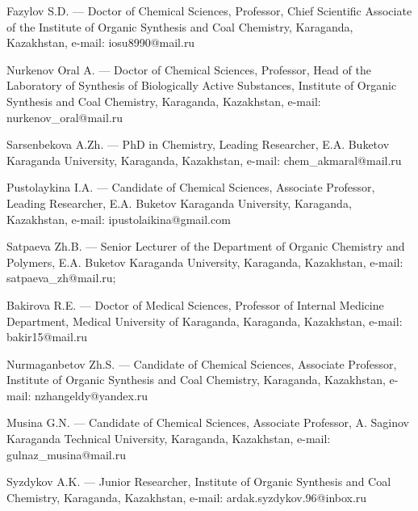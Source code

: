 \begin{authorinfo}
Fazylov S.D. — Doctor of Chemical Sciences, Professor, Chief
Scientific Associate of the Institute of Organic Synthesis and Coal
Chemistry, Karaganda, Kazakhstan, e-mail: iosu8990@mail.ru

Nurkenov Oral A. — Doctor of Chemical Sciences, Professor, Head of the
Laboratory of Synthesis of Biologically Active Substances, Institute
of Organic Synthesis and Coal Chemistry, Karaganda, Kazakhstan,
e-mail: nurkenov\_oral@mail.ru

Sarsenbekova A.Zh. — PhD in Chemistry, Leading Researcher,
E.A. Buketov Karaganda University, Karaganda, Kazakhstan, e-mail:
chem\_akmaral@mail.ru

Pustolaykina I.A. — Candidate of Chemical Sciences, Associate
Professor, Leading Researcher, E.A. Buketov Karaganda University,
Karaganda, Kazakhstan, e-mail: ipustolaikina@gmail.com

Satpaeva Zh.B. — Senior Lecturer of the Department of Organic
Chemistry and Polymers, E.A. Buketov Karaganda University, Karaganda,
Kazakhstan, e-mail: satpaeva\_zh@mail.ru;

Bakirova R.E. — Doctor of Medical Sciences, Professor of Internal
Medicine Department, Medical University of Karaganda, Karaganda,
Kazakhstan, e-mail: bakir15@mail.ru

Nurmaganbetov Zh.S. — Candidate of Chemical Sciences, Associate
Professor, Institute of Organic Synthesis and Coal Chemistry,
Karaganda, Kazakhstan, e-mail: nzhangeldy@yandex.ru

Musina G.N. — Candidate of Chemical Sciences, Associate Professor,
A. Saginov Karaganda Technical University, Karaganda, Kazakhstan,
e-mail: gulnaz\_musina@mail.ru

Syzdykov A.K. — Junior Researcher, Institute of Organic Synthesis and
Coal Chemistry, Karaganda, Kazakhstan, e-mail:
ardak.syzdykov.96@inbox.ru
\end{authorinfo}
